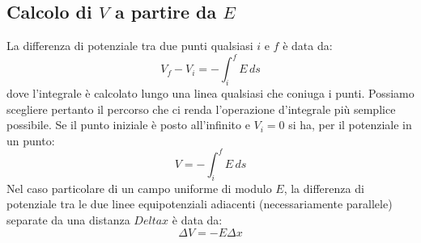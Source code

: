             \subsection{Calcolo di $V$ a partire da $E$} La differenza di 
            potenziale tra due punti qualsiasi $i$ e $f$ è data da:
                \begin{equation}
                    V_f - V_i = - \int_{i}^{f} E \,ds
                \end{equation}
            dove l'integrale è calcolato lungo una linea qualsiasi che coniuga 
            i punti. Possiamo scegliere pertanto il percorso che ci renda 
            l'operazione d'integrale più semplice possibile. Se il punto 
            iniziale è posto all'infinito e $V_i = 0$ si ha, per il potenziale
            in un punto:
                \begin{equation}
                    V = -\int_{i}^{f} E \,ds
                \end{equation}
            Nel caso particolare di un campo uniforme di modulo $E$, la 
            differenza di potenziale tra le due linee equipotenziali adiacenti
            (necessariamente parallele) separate da una distanza $Delta x$ è 
            data da:
                \begin{equation}
                    \Delta V = -E\Delta x
                \end{equation}